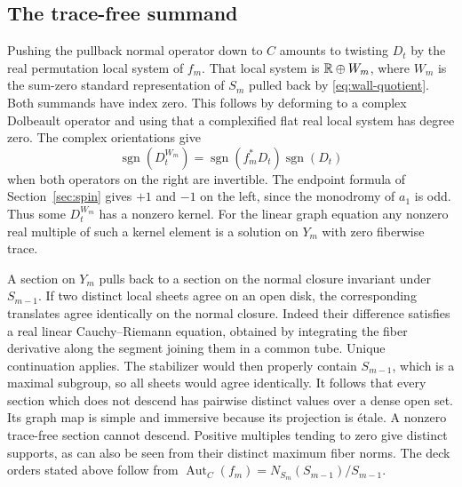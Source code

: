 \subsection*{The trace-free summand}
Pushing the pullback normal operator down to $C$ amounts to twisting
$D_t$ by the real permutation local system of $f_m$. That local
system is $\mathbb R\oplus W_m$, where $W_m$ is the sum-zero standard
representation of $S_m$ pulled back by \eqref{eq:wall-quotient}.
Both summands have index zero. This follows by deforming to a complex
Dolbeault operator and using that a complexified flat real local
system has degree zero. The complex orientations give
\begin{equation}\label{eq:wall-relative}
  \operatorname{sgn}(D_t^{W_m})=
  \operatorname{sgn}(f_m^*D_t)\operatorname{sgn}(D_t)
\end{equation}
when both operators on the right are invertible. The endpoint formula
of Section~\ref{sec:spin} gives $+1$ and $-1$ on the left, since the
monodromy of $a_1$ is odd. Thus some $D_t^{W_m}$ has a nonzero
kernel. For the linear graph equation any nonzero real multiple of
such a kernel element is a solution on $Y_m$ with zero fiberwise
trace.

A section on $Y_m$ pulls back to a section on the normal closure
invariant under $S_{m-1}$. If two distinct local sheets agree on an
open disk, the corresponding translates agree identically on the
normal closure. Indeed their difference satisfies a real linear
Cauchy--Riemann equation, obtained by integrating the fiber derivative
along the segment joining them in a common tube. Unique continuation
applies. The stabilizer would then properly contain $S_{m-1}$, which
is a maximal subgroup, so all sheets would agree identically. It
follows that every section which does not descend has pairwise distinct
values over a dense open set. Its graph map is simple and immersive
because its projection is \'etale. A nonzero trace-free section cannot
descend. Positive multiples tending to zero give distinct supports,
as can also be seen from their distinct maximum fiber norms.
The deck orders stated above follow from
$\operatorname{Aut}_C(f_m)=N_{S_m}(S_{m-1})/S_{m-1}$.


